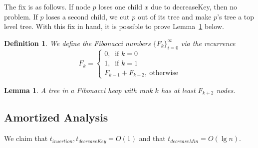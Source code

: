 \documentclass[11pt]{article}
\newtheorem{lemma}[theorem]{Lemma}
\newtheorem{definition}[theorem]{Definition}
\begin{document}
The fix is as follows. If node $p$ loses one child $x$ due to decreaseKey, then no problem. If $p$ loses a second child, we cut $p$ out of its tree and make $p$'s tree a top level tree. With this fix in hand, it is possible to prove Lemma~\ref{lem:fib} below.

\begin{definition}
We define the {\em Fibonacci numbers} $\{F_k\}_{i=0}^\infty$ via the recurrence
$$
F_k =
\begin{cases}
0,\ \text{ if } k=0\\
1,\ \text{ if } k = 1\\
F_{k-1} + F_{k-2},\ \text{otherwise}
\end{cases}
$$
\end{definition}

\begin{lemma}\label{lem:fib}
A tree in a Fibonacci heap with rank $k$ has at least $F_{k+2}$ nodes.
\end{lemma}

\subsection{Amortized Analysis}
We claim that  $t_{insertion}, t_{decreaseKey} = O(1)$ and that $t_{decreaseMin} = O(\lg n)$.
\end{document}
